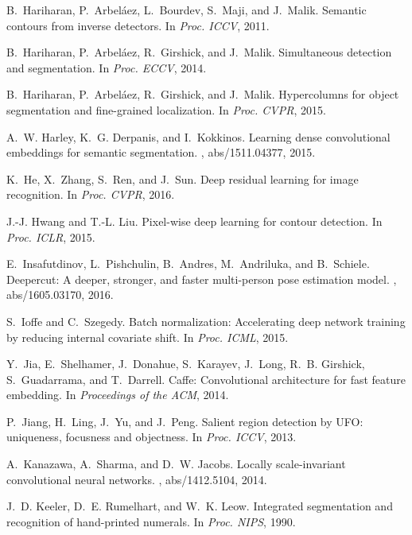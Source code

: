 \documentclass[10pt,twocolumn,letterpaper]{article}
\begin{document}
\begin{thebibliography}{100}
	B.~Hariharan, P.~Arbel{\'a}ez, L.~Bourdev, S.~Maji, and J.~Malik.
	\newblock Semantic contours from inverse detectors.
	\newblock In {\em Proc. {ICCV}}, 2011.
	
	B.~Hariharan, P.~Arbel{\'a}ez, R.~Girshick, and J.~Malik.
	\newblock Simultaneous detection and segmentation.
	\newblock In {\em Proc. {ECCV}}, 2014.
	
	B.~Hariharan, P.~Arbel{\'a}ez, R.~Girshick, and J.~Malik.
	\newblock Hypercolumns for object segmentation and fine-grained localization.
	\newblock In {\em Proc. {CVPR}}, 2015.
	
	A.~W. Harley, K.~G. Derpanis, and I.~Kokkinos.
	\newblock Learning dense convolutional embeddings for semantic segmentation.
	, abs/1511.04377, 2015.
	
	K.~He, X.~Zhang, S.~Ren, and J.~Sun.
	\newblock Deep residual learning for image recognition.
	\newblock In {\em Proc. {CVPR}}, 2016.
	
	J.-J. Hwang and T.-L. Liu.
	\newblock Pixel-wise deep learning for contour detection.
	\newblock In {\em Proc. {ICLR}}, 2015.
	
	E.~Insafutdinov, L.~Pishchulin, B.~Andres, M.~Andriluka, and B.~Schiele.
	\newblock Deepercut: {A} deeper, stronger, and faster multi-person pose
	estimation model.
	, abs/1605.03170, 2016.
	
	S.~Ioffe and C.~Szegedy.
	\newblock Batch normalization: Accelerating deep network training by reducing
	internal covariate shift.
	\newblock In {\em Proc. {ICML}}, 2015.
	
	Y.~Jia, E.~Shelhamer, J.~Donahue, S.~Karayev, J.~Long, R.~B. Girshick,
	S.~Guadarrama, and T.~Darrell.
	\newblock Caffe: Convolutional architecture for fast feature embedding.
	\newblock In {\em Proceedings of the {ACM}}, 2014.
	
	P.~Jiang, H.~Ling, J.~Yu, and J.~Peng.
	\newblock Salient region detection by {UFO:} uniqueness, focusness and
	objectness.
	\newblock In {\em Proc. {ICCV}}, 2013.
	
	A.~Kanazawa, A.~Sharma, and D.~W. Jacobs.
	\newblock Locally scale-invariant convolutional neural networks.
	, abs/1412.5104, 2014.
	
	J.~D. Keeler, D.~E. Rumelhart, and W.~K. Leow.
	\newblock Integrated segmentation and recognition of hand-printed numerals.
	\newblock In {\em Proc. {NIPS}}, 1990.
	

\end{thebibliography}
\end{document}
